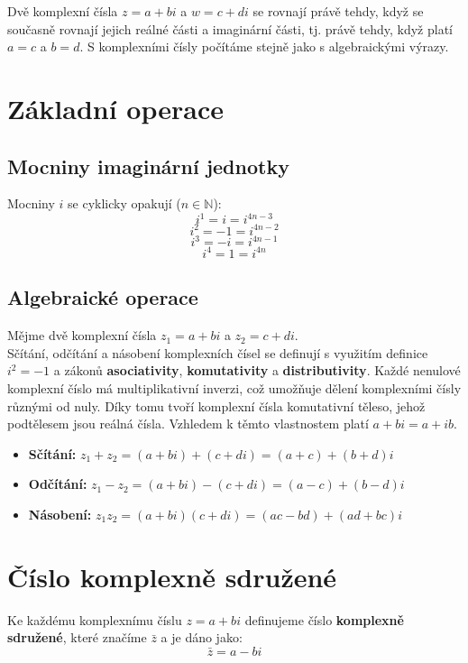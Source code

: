 \documentclass[12pt,a4paper]{report}
\begin{document}
	Dvě komplexní čísla $z = a+bi$ a $w = c+di$ se rovnají právě tehdy, když se současně rovnají jejich reálné části a imaginární části, tj. právě tehdy, když platí $a = c$ a $b = d$. S komplexními čísly počítáme stejně jako s algebraickými výrazy.
	
	
	\section{Základní operace}
	
	\subsection{Mocniny imaginární jednotky}
	
	Mocniny $i$ se cyklicky opakují ($n\in\mathbb{N}$):
	$$i^1=i=i^{4n-3}$$
	$$i^2=-1=i^{4n-2}$$
	$$i^3=-i=i^{4n-1}$$
	$$i^4=1=i^{4n}$$
	
	
	\subsection{Algebraické operace}
	Mějme dvě komplexní čísla $z_1 = a + bi$ a $z_2 = c + di$.\\
	Sčítání, odčítání a násobení komplexních čísel se definují s využitím definice $i^2=-1$ a zákonů \textbf{asociativity}, \textbf{komutativity} a \textbf{distributivity}. Každé nenulové komplexní číslo má multiplikativní inverzi, což umožňuje dělení komplexními čísly různými od nuly. Díky tomu tvoří komplexní čísla komutativní těleso, jehož podtělesem jsou reálná čísla. Vzhledem k těmto vlastnostem platí $a+bi = a+ib$.
	
	\begin{itemize}
		\item \textbf{Sčítání:} $z_1 + z_2 = (a+bi) + (c+di) = (a+c) + (b+d)i$
		\item \textbf{Odčítání:} $z_1 - z_2 = (a+bi) - (c+di) = (a-c) + (b-d)i$
		\item \textbf{Násobení:} $z_1 z_2 = (a+bi)(c+di)=(ac - bd) + (ad + bc)i$
	\end{itemize}
	
	
	\section{Číslo komplexně sdružené}
	Ke každému komplexnímu číslu $z = a + bi$ definujeme číslo \textbf{komplexně sdružené}, které značíme $\bar{z}$ a je dáno jako:
	\begin{equation}
		\bar{z} = a - bi
	\end{equation}
	
\end{document}
